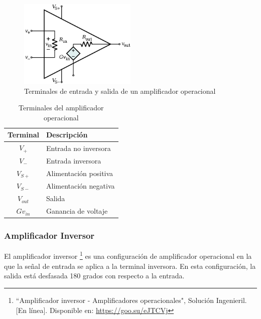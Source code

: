             \begin{figure}[H]
                \centering
                \includegraphics[width=0.5\textwidth]{img/Desarrollo/Amplificador_Operacional.png}
                \caption[Terminales de entrada y salida de un amplificador operacional]{Terminales de entrada y salida de un amplificador operacional\footnotemark}
                \label{fig:Amplificador_Operacional}
            \end{figure}

            \begin{table}[H]
                \centering
                \begin{tabular}{ c | l }
                    Terminal & Descripción \\ \hline
                    $V_+$ & Entrada no inversora \\
                    $V_-$ & Entrada inversora \\
                    $V_{S+}$ & Alimentación positiva \\
                    $V_{S-}$ & Alimentación negativa \\
                    $V_{out}$ & Salida \\
                    $Gv_{in}$ & Ganancia de voltaje \\
                \end{tabular}
                \caption{Terminales del amplificador operacional}
                \label{tab:terminales_amplificador}
            \end{table}

        \subsubsection{Amplificador Inversor}
            El amplificador inversor \footnote{``Amplificador inversor - Amplificadores operacionales", Solución Ingenieril. [En línea]. Disponible en: \url{https://goo.su/eJTCVj}} es una configuración de amplificador operacional en la que la señal de entrada se aplica a la terminal inversora. En esta configuración, la salida está desfasada 180 grados con respecto a la entrada.

